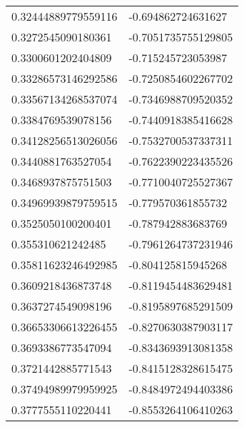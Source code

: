 \begin{supertabular}{ll}
0.32444889779559116 & -0.694862724631627    \\
0.3272545090180361  & -0.7051735755129805   \\
0.3300601202404809  & -0.715245723053987    \\
0.33286573146292586 & -0.7250854602267702   \\
0.33567134268537074 & -0.7346988709520352   \\
0.3384769539078156  & -0.7440918385416628   \\
0.34128256513026056 & -0.7532700537337311   \\
0.3440881763527054  & -0.7622390223435526   \\
0.3468937875751503  & -0.7710040725527367   \\
0.34969939879759515 & -0.779570361855732    \\
0.3525050100200401  & -0.787942883683769    \\
0.355310621242485   & -0.7961264737231946   \\
0.35811623246492985 & -0.804125815945268    \\
0.3609218436873748  & -0.8119454483629481   \\
0.3637274549098196  & -0.8195897685291509   \\
0.36653306613226455 & -0.8270630387903117   \\
0.3693386773547094  & -0.8343693913081358   \\
0.3721442885771543  & -0.8415128328615475   \\
0.37494989979959925 & -0.8484972494403386   \\
0.3777555110220441  & -0.8553264106410263   \\
\end{supertabular}
